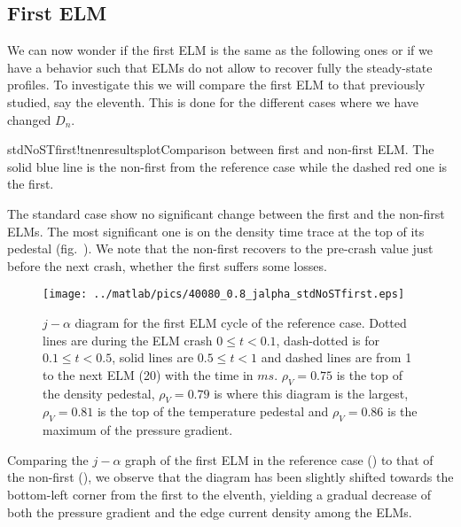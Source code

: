 \subsection{First ELM}\label{sec:results:ELMs:recover:first}
We can now wonder if the first ELM is the same as the following ones or if we have a behavior such that ELMs do not allow to recover fully the steady-state profiles. To investigate this we will compare the first ELM to that previously studied, say the eleventh. This is done for the different cases where we have changed $D_n$.

\begin{AllFigs}{stdNoSTfirst}{!t}{}{ne}{n}{resultsplot}{Comparison between first and non-first ELM. The solid blue line is the non-first from the reference case while the dashed red one is the first.}
\end{AllFigs}
The standard case show no significant change between the first and the non-first ELMs. The most significant one is on the density time trace at the top of its pedestal (fig.~). We note that the non-first recovers to the pre-crash value just before the next crash, whether the first suffers some losses.

\begin{figure}[!t]
\begin{center}
\vspace{1mm}
\texttt{[image: ../matlab/pics/40080\_0.8\_jalpha\_stdNoSTfirst.eps]}
\vspace{-5mm}
\end{center}
\caption{\footnotesize $j - \alpha$ diagram for the first ELM cycle of the reference case. Dotted lines are during the ELM crash $0 \le t <0.1$, dash-dotted is for $0.1 \le t < 0.5$, solid lines are $0.5 \le t < 1$ and dashed lines are from 1 to the next ELM (20) with the time in $ms$. $\rho_V = 0.75$ is the top of the density pedestal, $\rho_V = 0.79$ is where this diagram is the largest, $\rho_V = 0.81$ is the top of the temperature pedestal and $\rho_V = 0.86$ is the maximum of the pressure gradient.\label{fig:results:ELM:first:jalpha}}
\vspace{-0.5cm}
\end{figure}
Comparing the $j - \alpha$ graph of the first ELM in the reference case () to that of the non-first (), we observe that the diagram has been slightly shifted towards the bottom-left corner from the first to the elventh, yielding a gradual decrease of both the pressure gradient and the edge current density among the ELMs.

